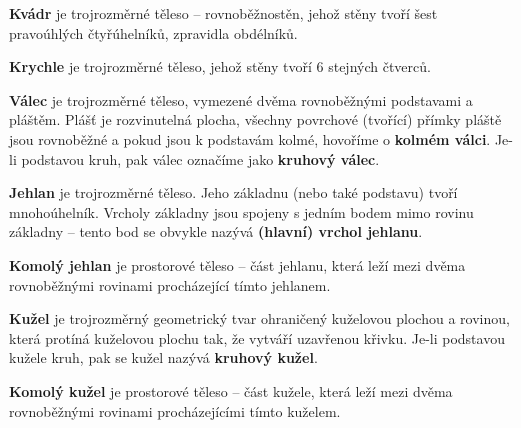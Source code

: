 \begin{definition}
  \textbf{Kvádr} je trojrozměrné těleso – rovnoběžnostěn, jehož stěny tvoří šest pravoúhlých čtyřúhelníků, zpravidla obdélníků.
\end{definition}

\begin{definition}
  \textbf{Krychle} je trojrozměrné těleso, jehož stěny tvoří 6 stejných čtverců.
\end{definition}

\begin{definition}
  \textbf{Válec} je trojrozměrné těleso, vymezené dvěma rovnoběžnými podstavami a pláštěm. Plášť je rozvinutelná plocha, všechny povrchové (tvořící) přímky pláště jsou rovnoběžné a pokud jsou k podstavám kolmé, hovoříme o \textbf{kolmém válci}. Je-li podstavou kruh, pak válec označíme jako \textbf{kruhový válec}.
\end{definition}

\begin{definition}
  \textbf{Jehlan} je trojrozměrné těleso. Jeho základnu (nebo také podstavu) tvoří mnohoúhelník. Vrcholy základny jsou spojeny s jedním bodem mimo rovinu základny – tento bod se obvykle nazývá \textbf{(hlavní) vrchol jehlanu}.
\end{definition}

\begin{definition}
  \textbf{Komolý jehlan} je prostorové těleso – část jehlanu, která leží mezi dvěma rovnoběžnými rovinami procházející tímto jehlanem.
\end{definition}

\begin{definition}
  \textbf{Kužel} je trojrozměrný geometrický tvar ohraničený kuželovou plochou a rovinou, která protíná kuželovou plochu tak, že vytváří uzavřenou křivku. Je-li podstavou kužele kruh, pak se kužel nazývá \textbf{kruhový kužel}.
\end{definition}

\begin{definition}
  \textbf{Komolý kužel} je prostorové těleso – část kužele, která leží mezi dvěma rovnoběžnými rovinami procházejícími tímto kuželem.
\end{definition}

